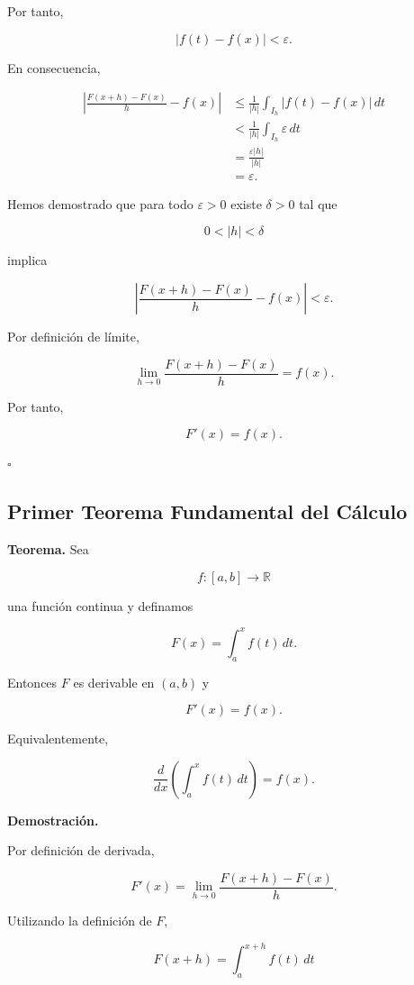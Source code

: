 \documentclass[12pt]{article}
\begin{document}
Por tanto,

\[
|f(t)-f(x)|<\varepsilon.
\]

En consecuencia,

\begin{align*}
\left|
\frac{F(x+h)-F(x)}{h}-f(x)
\right|
&\leq
\frac{1}{|h|}
\int_{I_h}|f(t)-f(x)|\,dt\\
&<
\frac{1}{|h|}
\int_{I_h}\varepsilon\,dt\\
&=
\frac{\varepsilon |h|}{|h|}\\
&=
\varepsilon.
\end{align*}

Hemos demostrado que para todo $\varepsilon>0$ existe $\delta>0$ tal que

\[
0<|h|<\delta
\]

implica

\[
\left|
\frac{F(x+h)-F(x)}{h}-f(x)
\right|
<\varepsilon.
\]

Por definición de límite,

\[
\lim_{h\to0}
\frac{F(x+h)-F(x)}{h}
=
f(x).
\]

Por tanto,

\[
\boxed{
F'(x)=f(x).
}
\]

\hfill$\square$
\subsection{Primer Teorema Fundamental del Cálculo}

\textbf{Teorema.}
Sea

\[
f:[a,b]\longrightarrow\mathbb{R}
\]

una función continua y definamos

\[
F(x)=\int_a^x f(t)\,dt.
\]

Entonces $F$ es derivable en $(a,b)$ y

\[
\boxed{
F'(x)=f(x).
}
\]

Equivalentemente,

\[
\boxed{
\frac{d}{dx}
\left(
\int_a^x f(t)\,dt
\right)
=
f(x).
}
\]

\textbf{Demostración.}

Por definición de derivada,

\[
F'(x)
=
\lim_{h\to0}
\frac{F(x+h)-F(x)}{h}.
\]

Utilizando la definición de $F$,

\[
F(x+h)
=
\int_a^{x+h}f(t)\,dt
\]
\end{document}
